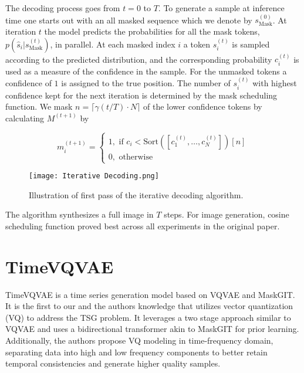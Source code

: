 \documentclass[../../thesis.tex]{subfiles}
\begin{document}
The decoding process goes from $t = 0$ to $T$. To generate a sample at inference time one starts out with an all masked sequence which we denote by $s_\text{Mask}^{(0)}$. At iteration $t$ the model predicts the probabilities for all the mask tokens, $p(\widehat{s}_i|s_\text{Mask}^{(t)})$, in parallel. At each masked index $i$ a token $s_i^{(t)}$ is sampled according to the predicted distribution, and the corresponding probability $c_i^{(t)}$ is used as a measure of the confidence in the sample. For the unmasked tokens a confidence of $1$ is assigned to the true position. The number of $s_i^{(t)}$ with highest confidence kept for the next iteration is determined by the mask scheduling function. We mask $n = \lceil \gamma(t/T)\cdot N \rceil$ of the lower confidence tokens by calculating $M^{(t+1)}$ by 

\begin{equation}
    m_i^{(t+1)} = 
    \begin{cases}
        1, \text{ if } c_i < \text{Sort}([c_1^{(t)},\dots,c_N^{(t)}])[n]\\
        0, \text{ otherwise} 
    \end{cases}
\end{equation}

\begin{figure}[h]
    \texttt{[image: Iterative Decoding.png]}
    \centering 
    \label{fig:IterativeDecoding}
    \caption{Illustration of first pass of the iterative decoding algorithm.}
\end{figure}

The algorithm synthesizes a full image in $T$ steps. For image generation, cosine scheduling function proved best across all experiments in the original paper.


\section{TimeVQVAE}

TimeVQVAE is a time series generation model based on VQVAE and MaskGIT. It is the first to our and the authors knowledge that utilizes vector quantization (VQ) to address the TSG problem. It leverages a two stage approach similar to VQVAE and uses a bidirectional transformer akin to MaskGIT for prior learning. Additionally, the authors propose VQ modeling in time-frequency domain, separating data into high and low frequency components to better retain temporal consistencies and generate higher quality samples.\newline
\end{document}

